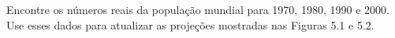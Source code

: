 Encontre os números reais da população mundial para 1970, 1980, 1990 e 2000. Use esses dados para atualizar as projeções mostradas nas Figuras 5.1 e 5.2.
